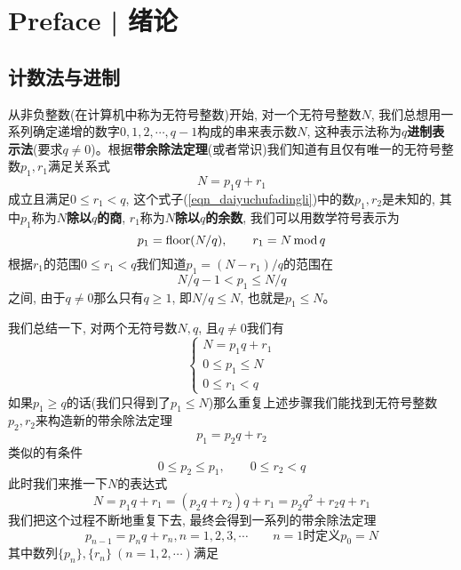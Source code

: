 \chapter*{Preface | 绪论}
\section*{计数法与进制}
\par 从非负整数(在计算机中称为无符号整数)开始, 对一个无符号整数$N$, 我们总想用一系列确定递增的数字$0,1,2,\cdots,q-1$构成的串来表示数$N$, 这种表示法称为\textbf{$q$进制表示法}(要求$q\neq 0$)。根据\textbf{带余除法定理}(或者常识)我们知道有且仅有唯一的无符号整数$p_1,r_1$满足关系式
\begin{equation}\label{eqn_daiyuchufadingli}
    N=p_1q+r_1
\end{equation}
成立且满足$0\leq r_1<q$, 这个式子(\ref{eqn_daiyuchufadingli})中的数$p_1,r_2$是未知的, 其中$p_1$称为\textbf{$N$除以$q$的商}, $r_1$称为\textbf{$N$除以$q$的余数}, 我们可以用数学符号表示为
\begin{equation}
    p_1=\mathop{\rm floor}(N/q),\qquad r_1=N\mod q
\end{equation}
根据$r_1$的范围$0\leq r_1<q$我们知道$p_1=(N-r_1)/q$的范围在
$$
    N/q-1<p_1\leq N/q
$$
之间, 由于$q\neq 0$那么只有$q\geq 1$, 即$N/q\leq N$, 也就是$p_1\leq N$。
\par 我们总结一下, 对两个无符号数$N,q$, 且$q\neq 0$我们有
\begin{equation}
    \begin{cases}N=p_1q+r_1\\0\leq p_1\leq N\\0\leq r_1<q\end{cases}
\end{equation}
如果$p_1\geq q$的话(我们只得到了$p_1\leq N$)那么重复上述步骤我们能找到无符号整数$p_2,r_2$来构造新的带余除法定理
\begin{equation}
    p_1=p_2q+r_2
\end{equation}
类似的有条件
$$0\leq p_2\leq p_1,\qquad 0\leq r_2<q$$
此时我们来推一下$N$的表达式
\begin{equation}
        N=p_1q+r_1=(p_2q+r_2)q+r_1=p_2q^2+r_2q+r_1
\end{equation}
我们把这个过程不断地重复下去, 最终会得到一系列的带余除法定理
\begin{equation}
    p_{n-1}=p_nq+r_n, n=1,2,3,\cdots\qquad\text{$n=1$时定义$p_0=N$}
\end{equation}
其中数列$\{p_n\},\{r_n\}\ (n=1,2,\cdots)$满足
